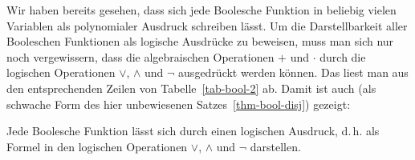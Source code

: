 \begin{refsegment}
Wir haben bereits gesehen, dass sich jede Boolesche Funktion in beliebig
vielen Variablen als polynomialer
Ausdruck schreiben lässt.
Um die Darstellbarkeit aller Booleschen Funktionen als
logische Ausdrücke
zu beweisen, muss man sich nur noch vergewissern, dass die algebraischen
Operationen $+$ und $\cdot$ durch die logischen Operationen $\vee$, $\wedge$
und $\neg$ ausgedrückt werden können. Das liest man aus den entsprechenden
Zeilen von Tabelle~\ref{tab-bool-2} ab. Damit ist auch (als schwache Form
des hier unbewiesenen Satzes~\ref{thm-bool-disj}) gezeigt:

\begin{satz}\label{thm-bool-log}
   Jede Boolesche Funktion lässt sich durch einen logischen Ausdruck,
   d.\,h. als Formel in den logischen Operationen $\vee$, $\wedge$ und
   $\neg$ darstellen.
\end{satz}


\end{refsegment}
